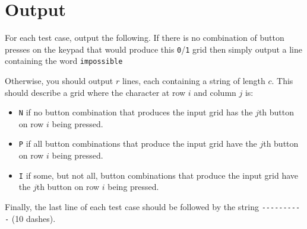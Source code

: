 \section*{Output}
For each test case, output the following. If there is no combination of
button presses on the keypad that would produce this \texttt{0}/\texttt{1}
grid then simply output a line containing the word \texttt{impossible}

Otherwise, you should output $r$ lines, each containing a string of length
$c$. This should describe a grid where the character at row $i$ and column
$j$ is:
\begin{itemize}
\item \texttt{N} if no button combination that produces
the input grid has the $j$th button on row $i$ being pressed.
\item \texttt{P} if all button combinations that produce
the input grid have the $j$th button on row $i$ being pressed.
\item \texttt{I} if some, but not all,
button combinations that produce the input
grid have the $j$th button on row $i$ being pressed.
\end{itemize}

Finally, the last line of each test case should be followed
by the string \verb|----------| (10 dashes).
